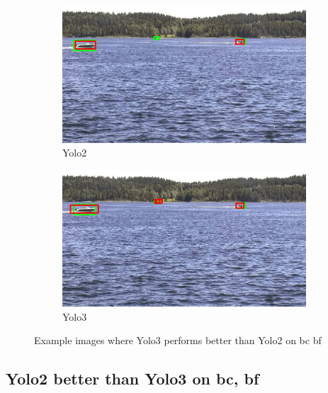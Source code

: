 \begin{figure}[h!]
\begin{subfigure}{.5\textwidth}
  \centering
  \includegraphics[width=0.9\linewidth]{results/case_buildings/yolo23/3better/yolo2/selected_06_25_frame0264.jpg}
  \caption{Yolo2}
\end{subfigure}%
\begin{subfigure}{.5\textwidth}
  \centering
  \includegraphics[width=.9\linewidth]{results/case_buildings/yolo23/3better/yolo3/selected_06_25_frame0264.jpg}
  \caption{Yolo3}
\end{subfigure}
\caption{Example images where Yolo3 performs better than Yolo2 on bc bf}
\label{img:yolo3_better}

\end{figure}

\newpage

\subsection{Yolo2 better than Yolo3 on bc, bf}
\label{sec:2better}


